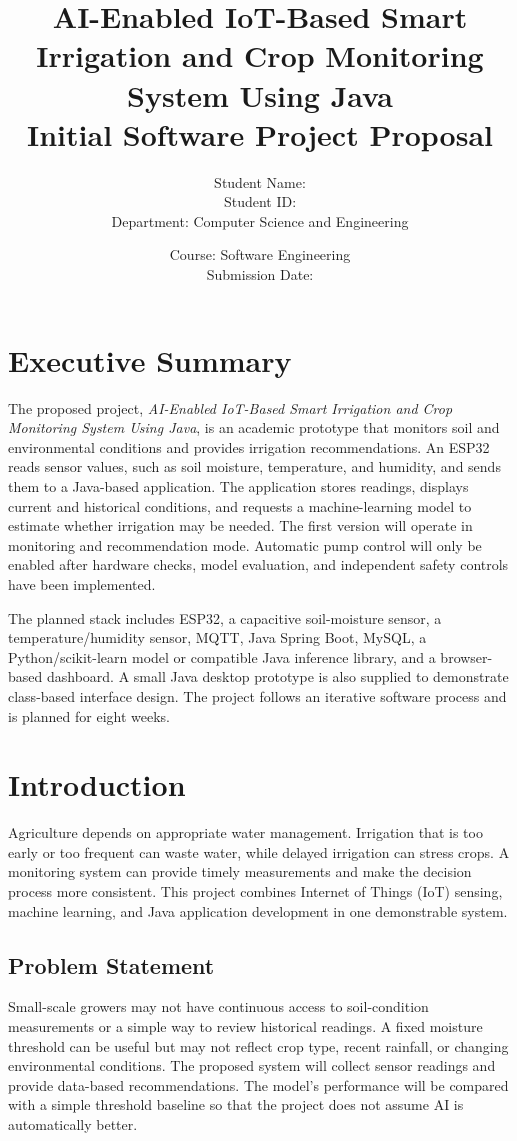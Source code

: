 \documentclass[12pt,a4paper]{report}
\title{\textbf{AI-Enabled IoT-Based Smart Irrigation and Crop Monitoring System Using Java}\\[0.5em]
\large Initial Software Project Proposal}
\author{Student Name: \underline{\hspace{6cm}}\\Student ID: \underline{\hspace{6cm}}\\Department: Computer Science and Engineering}
\date{Course: Software Engineering\\Submission Date: \underline{\hspace{4cm}}}
\begin{document}
\maketitle
{}
\tableofcontents
\listoffigures
\clearpage
{}

\chapter{Executive Summary}
The proposed project, \textit{AI-Enabled IoT-Based Smart Irrigation and Crop Monitoring System Using Java}, is an academic prototype that monitors soil and environmental conditions and provides irrigation recommendations. An ESP32 reads sensor values, such as soil moisture, temperature, and humidity, and sends them to a Java-based application. The application stores readings, displays current and historical conditions, and requests a machine-learning model to estimate whether irrigation may be needed. The first version will operate in monitoring and recommendation mode. Automatic pump control will only be enabled after hardware checks, model evaluation, and independent safety controls have been implemented.

The planned stack includes ESP32, a capacitive soil-moisture sensor, a temperature/humidity sensor, MQTT, Java Spring Boot, MySQL, a Python/scikit-learn model or compatible Java inference library, and a browser-based dashboard. A small Java desktop prototype is also supplied to demonstrate class-based interface design. The project follows an iterative software process and is planned for eight weeks.

\chapter{Introduction}
Agriculture depends on appropriate water management. Irrigation that is too early or too frequent can waste water, while delayed irrigation can stress crops. A monitoring system can provide timely measurements and make the decision process more consistent. This project combines Internet of Things (IoT) sensing, machine learning, and Java application development in one demonstrable system.

\section{Problem Statement}
Small-scale growers may not have continuous access to soil-condition measurements or a simple way to review historical readings. A fixed moisture threshold can be useful but may not reflect crop type, recent rainfall, or changing environmental conditions. The proposed system will collect sensor readings and provide data-based recommendations. The model's performance will be compared with a simple threshold baseline so that the project does not assume AI is automatically better.
\end{document}
